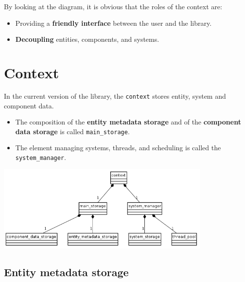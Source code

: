 \documentclass[twoside, 12pt, a4paper, openany]{book}
\let\origfigure=\figure
\let\endorigfigure=\endfigure
\renewenvironment{figure}[1][]{%
\origfigure[H]
}{%
\endorigfigure
}
\begin{document}
By looking at the diagram, it is obvious that the roles of the context
are:

\begin{itemize}
\item
  Providing a \textbf{friendly interface} between the user and the
  library.
\item
  \textbf{Decoupling} entities, components, and systems.
\end{itemize}

\section{Context}\label{context}

In the current version of the library, the
\texttt{context}
stores entity, system and component data.

\begin{itemize}
\item
  The composition of the \textbf{entity metadata storage} and of the
  \textbf{component data storage} is called
  \texttt{main_storage}.
\item
  The element managing systems, threads, and scheduling is called the
  \texttt{system_manager}.
\end{itemize}

\begin{figure}[htbp]
\centering
\includegraphics[width=0.80000\textwidth]{source/figures/generated/ecst/architecture/context_aggregation.png}
\caption{ECST architecture: context}
\end{figure}

\subsection{Entity metadata storage}\label{entity-metadata-storage}
\end{document}
